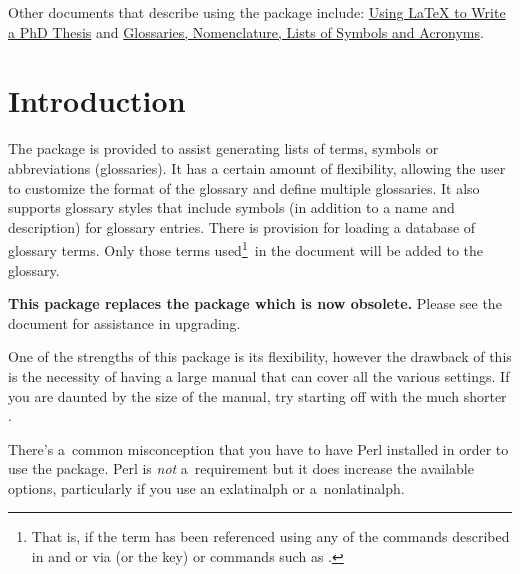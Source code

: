\documentclass[report,inlinetitle]{nlctdoc}
\newcommand*{\gloskey}[2][newglossaryentry]{\csopt{#1}{#2}}
\begin{document}
Other documents that describe using the  package include:
\href{http://www.dickimaw-books.com/latex/thesis/}{Using LaTeX to Write a PhD Thesis}
and
\href{http://www.latex-community.org/know-how/latex/55-latex-general/263-glossaries-nomenclature-lists-of-symbols-and-acronyms}{Glossaries,
Nomenclature, Lists of Symbols and Acronyms}.

\clearpage
{}
\tableofcontents
\clearpage
{}
\listofexamples
\clearpage
{}
\listoftables

\clearpage
\printglossaries

\glsresetall

 \chapter{Introduction}
\label{sec:intro}

The  package is provided to assist generating
lists of terms, symbols or abbreviations (glossaries). It has a certain amount of flexibility, allowing the
user to customize the format of the glossary and define multiple
glossaries. It also supports glossary styles that
include symbols (in addition to a name and description) for glossary
entries. There is provision for loading a database of glossary
terms. Only those terms used\footnote{That is, if the term has been
referenced using any of the commands described in
 and  or via
 (or the \gloskey{see} key) or commands such as
.}\ in the document will be added to the glossary.

\textbf{This package replaces the  package which is
now obsolete.} Please see the document  for
assistance in upgrading.

One of the strengths of this package is its flexibility, however
the drawback of this is the necessity of having a large manual
that can cover all the various settings. If you are daunted by the
size of the manual, try starting off with the much shorter
.

\begin{important}
There's a~common misconception that you have to have Perl installed
in order to use the  package. Perl is \emph{not}
a~requirement but it does increase the available options,
particularly if you use an \gls{exlatinalph} or a~\gls{nonlatinalph}.
\end{important}
\end{document}
